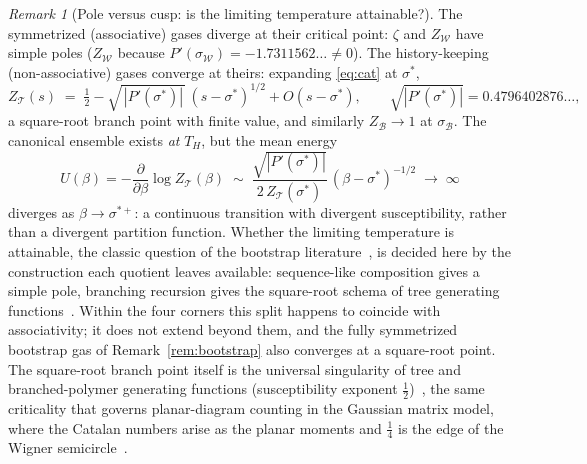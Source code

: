 \documentclass[11pt]{article}
\newcommand{\cT}{\mathcal{T}}   %
\newcommand{\cW}{\mathcal{W}}   %
\newcommand{\cB}{\mathcal{B}}   %
\numberwithin{equation}{section}
\theoremstyle{plain}
\theoremstyle{definition}
\theoremstyle{remark}
\newtheorem{remark}[theorem]{Remark}
\begin{document}
\begin{remark}[Pole versus cusp: is the limiting temperature attainable?]
\label{rem:cusp}
The symmetrized (associative) gases diverge at their critical point: $\zeta$ and
$Z_\cW$ have simple poles ($Z_\cW$ because $P'(\sigma_\cW) = -1.7311562\dots \ne 0$).
The history-keeping (non-associative) gases converge at theirs: expanding
\eqref{eq:cat} at $\sigma^{*}$,
\[
Z_\cT(s) \;=\; \tfrac12 - \sqrt{\,|P'(\sigma^{*})|\,}\,(s-\sigma^{*})^{1/2} + O(s-\sigma^{*}),
\qquad \sqrt{|P'(\sigma^{*})|} = 0.4796402876\dots,
\]
a square-root branch point with finite value, and similarly $Z_\cB \to 1$ at
$\sigma_\cB$. The canonical ensemble exists \emph{at} $T_H$, but the mean energy
\[
U(\beta) = -\frac{\partial}{\partial \beta} \log Z_\cT(\beta)
\;\sim\; \frac{\sqrt{|P'(\sigma^{*})|}}{2\,Z_\cT(\sigma^{*})}\,(\beta - \sigma^{*})^{-1/2}
\;\to\; \infty
\]
diverges as $\beta \to \sigma^{*+}$: a continuous transition with divergent
susceptibility, rather than a divergent partition function. Whether the limiting
temperature is attainable, the classic question of the bootstrap
literature~\cite{nahm}, is decided here by the construction each quotient leaves
available: sequence-like composition gives a simple pole, branching recursion
gives the square-root schema of tree generating functions~\cite{flajolet}. Within
the four corners this split happens to coincide with associativity; it does not
extend beyond them, and the fully symmetrized bootstrap gas of
Remark~\ref{rem:bootstrap} also converges at a square-root point. The square-root
branch point itself is
the universal singularity of tree and branched-polymer generating functions
(susceptibility exponent $\tfrac12$)~\cite{adj}, the same criticality that governs
planar-diagram counting in the Gaussian matrix model, where the Catalan numbers arise
as the planar moments and $\tfrac14$ is the edge of the Wigner
semicircle~\cite{bipz}.
\end{remark}
\end{document}
